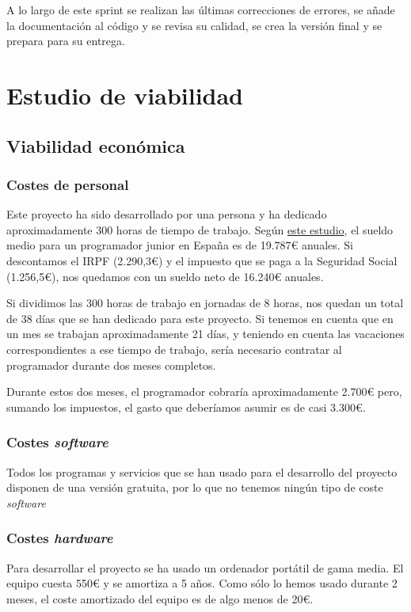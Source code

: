 A lo largo de este sprint se realizan las últimas correcciones de errores, se añade la documentación al código y se revisa su calidad, se crea la versión final y se prepara para su entrega.

\section{Estudio de viabilidad}

\subsection{Viabilidad económica}
\subsubsection{Costes de personal}
Este proyecto ha sido desarrollado por una persona y ha dedicado aproximadamente 300 horas de tiempo de trabajo. Según \href{https://www.lainformacion.com/management/empleo-mejores-trabajos-junior-jovenes-sueldo-alto/6536295/}{este estudio}, el sueldo medio para un programador junior en España es de 19.787€ anuales. Si descontamos el IRPF (2.290,3€) y el impuesto que se paga a la Seguridad Social (1.256,5€), nos quedamos con un sueldo neto de 16.240€ anuales.

Si dividimos las 300 horas de trabajo en jornadas de 8 horas, nos quedan un total de 38 días que se han dedicado para este proyecto. Si tenemos en cuenta que en un mes se trabajan aproximadamente 21 días, y teniendo en cuenta las vacaciones correspondientes a ese tiempo de trabajo, sería necesario contratar al programador durante dos meses completos.

Durante estos dos meses, el programador cobraría aproximadamente 2.700€ pero, sumando los impuestos, el gasto que deberíamos asumir es de casi 3.300€.

\subsubsection{Costes \textit{software}}
Todos los programas y servicios que se han usado para el desarrollo del proyecto disponen de una versión gratuita, por lo que no tenemos ningún tipo de coste \textit{software}

\subsubsection{Costes \textit{hardware}}
Para desarrollar el proyecto se ha usado un ordenador portátil de gama media. El equipo cuesta 550€ y se amortiza a 5 años. Como sólo lo hemos usado durante 2 meses, el coste amortizado del equipo es de algo menos de 20€.

